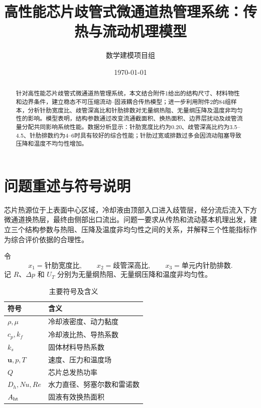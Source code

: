 \documentclass[UTF8,a4paper,12pt]{ctexart}
\title{高性能芯片歧管式微通道热管理系统\问题一：传热与流动机理模型}
\author{数学建模项目组}
\date{\today}
\begin{document}
\maketitle

\begin{abstract}
针对高性能芯片歧管式微通道热管理系统，本文结合附件1给出的结构尺寸、材料物性和边界条件，建立稳态不可压缩流动--固液耦合传热模型；进一步利用附件2的84组样本，分析针肋宽度比、歧管深高比和针肋排数对无量纲热阻、无量纲压降及温度非均匀性的影响。模型表明，结构参数通过改变流通截面积、换热面积、边界层扰动及歧管流量分配共同影响系统性能。数据分析显示：针肋宽度比约为0.20、歧管深高比约为3.5--4.5、针肋排数约为4--6时具有较好的综合性能；针肋过宽或排数过多会因流动阻塞导致压降和温度不均匀性增加。
\end{abstract}

\section{问题重述与符号说明}

芯片热源位于上表面中心区域，冷却液由顶部入口进入歧管层，经分流后流入下方微通道换热层，最终由侧部出口流出。问题一要求从传热和流动基本机理出发，建立三个结构参数与热阻、压降及温度非均匀性之间的关系，并解释三个性能指标作为综合评价依据的合理性。

令
\begin{equation}
 x_1=\text{针肋宽度比},\qquad x_2=\text{歧管深高比},\qquad x_3=\text{单元内针肋排数}.
\end{equation}
记 $R$、$\Delta p$ 和 $U_T$ 分别为无量纲热阻、无量纲压降和温度非均匀性。

\begin{table}[H]
\centering
\caption{主要符号及含义}
\begin{tabular}{>{\raggedright\arraybackslash}p{}p{}}
\toprule
符号 & 含义 \\
\midrule
$\rho,\mu$ & 冷却液密度、动力黏度 \\
$c_p,k_f$ & 冷却液比热、导热系数 \\
$k_s$ & 固体材料导热系数 \\
$\bm u,p,T$ & 速度、压力和温度场 \\
$Q$ & 芯片总发热功率 \\
$D_h,Nu,Re$ & 水力直径、努塞尔数和雷诺数 \\
$A_{\rm ht}$ & 固液有效换热面积 \\
\bottomrule
\end{tabular}
\end{table}
\end{document}
